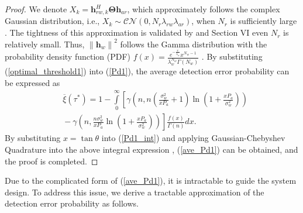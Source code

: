 \documentclass[conference]{IEEEtran}
\begin{document}
\begin{proof}
We denote ${X_k} = {\mathbf{h}}_{rw,k}^H{\mathbf{\Theta }}{{\mathbf{h}}_{ar}}$, which approximately follows the complex Gaussian distribution, i.e., ${X_k} \sim \mathcal{CN}\left( {0,{N_r}{\lambda _{rw}}{\lambda _{ar}}} \right)$, when $N_r$ is sufficiently large \cite{IRS_single2}. The tightness of this approximation is validated by \cite{IRS_single2} and Section VI even $N_r$ is relatively small. Thus, ${\left\| {{{\mathbf{h}}_w}} \right\|^2}$ follows the Gamma distribution with the probability density function (PDF) ${f}(x) = \frac{{{e^{ - \frac{x}{{{\lambda _w}}}}}{x^{{N_w} - 1}}}}{{\lambda _w^{{N_w}}\Gamma \left( {{N_w}} \right)}}$ \cite{multi_exp}. By substituting (\ref{optimal_threshold1}) into (\ref{Pd1}), the average detection error probability can be expressed as
	\begin{equation}\label{Pd1_int}
		\begin{aligned}
		&\overline \xi \left( {{\tau ^*}} \right) \!=\! 1 \!-\!\!\int\limits_0^\infty\! {\left[ {\gamma \!\left(\! {n,n\left( {\frac{{\sigma _w^2}}{{x{P_a}}} \!+\! 1} \right)\ln \!\left(\! {1 \!+\! \frac{{x{P_a}}}{{\sigma _w^2}}} \!\right)\!} \!\right)} \right.}  \\
		& \left. {  \!- \gamma \!\left(\! {n,\frac{{n\sigma _w^2}}{{x{P_a}}}\ln \!\left(\! {1 \!+\! \frac{{x{P_a}}}{{\sigma _w^2}}} \!\right)\!} \!\right)\!} \right]  \frac{{{f}(x)}}{{\Gamma \left( n \right)}}dx.
		\end{aligned}
	\end{equation}
By substituting $x = \tan \theta $ into (\ref{Pd1_int}) and applying Gaussian-Chebyshev Quadrature into the above integral expression \cite{Quadrature},  (\ref{ave_Pd1}) can be obtained, and the proof is completed.
\end{proof}

Due to the complicated form of (\ref{ave_Pd1}), it is intractable to guide the system design. To address this issue, we derive a tractable approximation of the detection error probability as follows.
\end{document}
